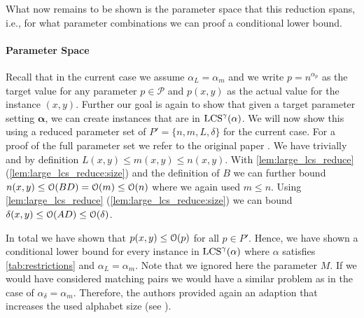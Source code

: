 What now remains to be shown is the parameter space that this reduction spans, i.e., for what \lcs{} parameter combinations we can proof a conditional lower bound.







\paragraph*{Parameter Space}
Recall that in the current case we assume $\alpha_L = \alpha_m$ and we write $p = n^{\alpha_p}$ as the target value for any parameter $p \in \mathcal{P}$ and $p(x,y)$ as the actual value for the \lcs{} instance $(x,y)$.
Further our goal is again to show that given a target parameter setting $\mathbf{\alpha}$, we can create instances that are in $\text{LCS}^\gamma(\mathbf{\alpha})$.
We will now show this using a reduced parameter set of $P' = \{n, m, L, \delta\}$ for the current case.
For a proof of the full parameter set we refer to the original paper \cite[section 9.2.2]{Bringman.2018}.
We have trivially and by definition $L(x,y) \leq m(x,y) \leq n(x,y)$.
With \autoref{lem:large_lcs_reduce} (\ref{lem:large_lcs_reduce:size}) and the definition of $B$ we can further bound $n(x,y) \leq \mathcal{O}(BD) = \mathcal{O}(m) \leq \mathcal{O}(n)$ where we again used $m \leq n$.
Using \autoref{lem:large_lcs_reduce} (\ref{lem:large_lcs_reduce:size}) we can bound $\delta(x,y) \leq \mathcal{O}(AD) \leq \mathcal{O}(\delta)$.

In total we have shown that $p(x,y) \leq \mathcal{O}(p)$ for all $p \in P'$.
Hence, we have shown a conditional lower bound for every instance in $\text{LCS}^\gamma(\mathbb{\alpha})$ where $\mathbb{\alpha}$ satisfies \autoref{tab:restrictions} and $\alpha_L = \alpha_m$.
%
Note that we ignored here the parameter $M$.
If we would have considered matching pairs we would have a similar problem as in the case of $\alpha_\delta = \alpha_m$.
Therefore, the authors provided again an adaption that increases the used alphabet size (see \cite[section 9.2.3]{Bringman.2018}).